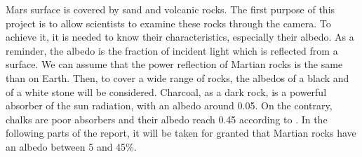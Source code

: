 \label{albedo}
Mars surface is covered by sand and volcanic rocks. The first purpose of this project is to allow scientists to examine these rocks through the camera. To achieve it, it is needed to know their characteristics, especially their albedo. As a reminder, the albedo is the fraction of incident light which is reflected from a surface. We can assume that the power reflection of Martian rocks is the same than on Earth. Then, to cover a wide range of rocks, the albedos of a black and of a white stone will be considered. Charcoal, as a dark rock, is a powerful absorber of the sun radiation, with an albedo around 0.05. On the contrary, chalks are poor absorbers and their albedo reach 0.45 according to \cite{albedo}. In the following parts of the report, it will be taken for granted that Martian rocks have an albedo between 5 and 45\%.
